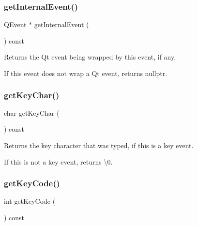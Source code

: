 \subsubsection{\texorpdfstring{get\+Internal\+Event()}{getInternalEvent()}}
{\footnotesize\ttfamily Q\+Event $\ast$ get\+Internal\+Event (\begin{DoxyParamCaption}{ }\end{DoxyParamCaption}) const\hspace{0.3cm}{\ttfamily [virtual]}}



Returns the Qt event being wrapped by this event, if any. 

If this event does not wrap a Qt event, returns nullptr. \mbox{\label{classsgl_1_1GEvent_ab23396e09d92df320d2324b47a0766e8}} 
\subsubsection{\texorpdfstring{get\+Key\+Char()}{getKeyChar()}}
{\footnotesize\ttfamily char get\+Key\+Char (\begin{DoxyParamCaption}{ }\end{DoxyParamCaption}) const\hspace{0.3cm}{\ttfamily [virtual]}}



Returns the key character that was typed, if this is a key event. 

If this is not a key event, returns \textquotesingle{}\textbackslash{}0\textquotesingle{}. \mbox{\label{classsgl_1_1GEvent_a71429f4b3c8f3c5097fe39e50501bbb6}} 
\subsubsection{\texorpdfstring{get\+Key\+Code()}{getKeyCode()}}
{\footnotesize\ttfamily int get\+Key\+Code (\begin{DoxyParamCaption}{ }\end{DoxyParamCaption}) const\hspace{0.3cm}{\ttfamily [virtual]}}



